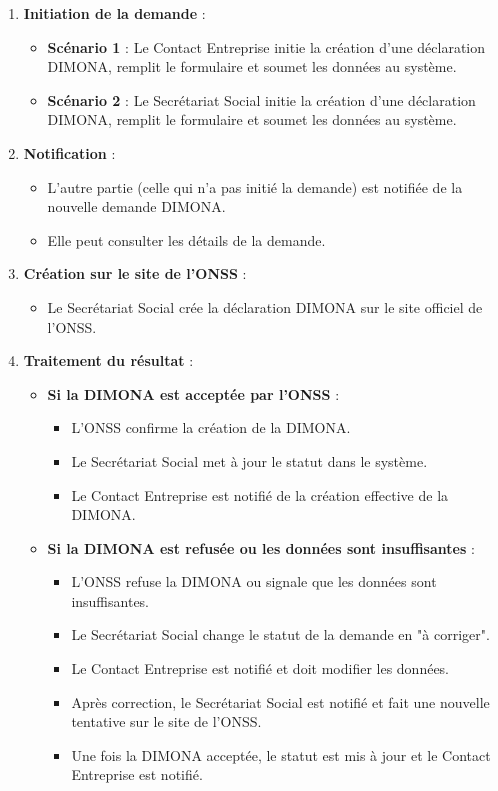 \begin{enumerate}
  \item \textbf{Initiation de la demande} :
    \begin{itemize}
      \item \textbf{Scénario 1} : Le Contact Entreprise initie la création d'une déclaration DIMONA, remplit le formulaire et soumet les données au système.
      \item \textbf{Scénario 2} : Le Secrétariat Social initie la création d'une déclaration DIMONA, remplit le formulaire et soumet les données au système.
    \end{itemize}

  \item \textbf{Notification} :
    \begin{itemize}
      \item L'autre partie (celle qui n'a pas initié la demande) est notifiée de la nouvelle demande DIMONA.
      \item Elle peut consulter les détails de la demande.
    \end{itemize}

  \item \textbf{Création sur le site de l'ONSS} :
    \begin{itemize}
      \item Le Secrétariat Social crée la déclaration DIMONA sur le site officiel de l'ONSS.
    \end{itemize}

  \item \textbf{Traitement du résultat} :
    \begin{itemize}
      \item \textbf{Si la DIMONA est acceptée par l'ONSS} :
        \begin{itemize}
          \item L'ONSS confirme la création de la DIMONA.
          \item Le Secrétariat Social met à jour le statut dans le système.
          \item Le Contact Entreprise est notifié de la création effective de la DIMONA.
        \end{itemize}
      \item \textbf{Si la DIMONA est refusée ou les données sont insuffisantes} :
        \begin{itemize}
          \item L'ONSS refuse la DIMONA ou signale que les données sont insuffisantes.
          \item Le Secrétariat Social change le statut de la demande en "à corriger".
          \item Le Contact Entreprise est notifié et doit modifier les données.
          \item Après correction, le Secrétariat Social est notifié et fait une nouvelle tentative sur le site de l'ONSS.
          \item Une fois la DIMONA acceptée, le statut est mis à jour et le Contact Entreprise est notifié.
        \end{itemize}
    \end{itemize}
\end{enumerate}

